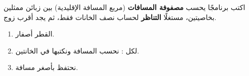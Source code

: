 \begin{statement}
اكتب برنامجًا يحسب \textbf{مصفوفة المسافات}  (مربع المسافة الإقليدية) بين  زبائن ممثلين بخاصيتين، مستغلًا \textbf{التناظر}  لحساب نصف الخانات فقط، ثم يجد أقرب زوج.
\end{statement}
\begin{stepsbox}\begin{enumerate}
\item القطر أصفار.
\item لكل : نحسب المسافة ونكتبها في الخانتين.
\item نحتفظ بأصغر مسافة.
\end{enumerate}\end{stepsbox}
